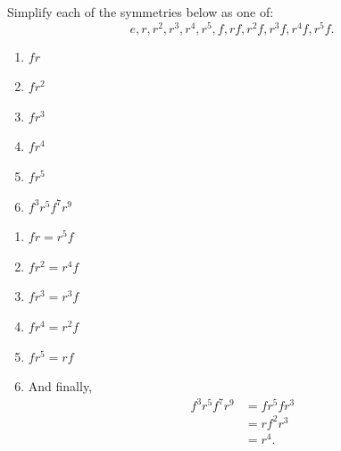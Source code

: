\documentclass[noauthor,nooutcomes,hints,handout]{ximera}
\begin{document}
\begin{question}
 Simplify each of the symmetries below as one of:
 \[
 e,r,r^2,r^3,r^4,r^5,f,rf,r^2f,r^3f, r^4f,r^5f.
 \]

 \begin{enumerate}
 \item $fr$
 \item $fr^2$
 \item $fr^3$
 \item $fr^4$
 \item $fr^5$
 \item $f^3r^5f^7r^9$
 \end{enumerate}
 \begin{freeResponse}
   \begin{enumerate}
   \item $fr = r^5f$
   \item $fr^2 = r^4f$
   \item $fr^3 = r^3f$
   \item $fr^4 = r^2f$
   \item $fr^5 = rf$
   \item And finally,
     \begin{align*}
    f^3r^5f^7r^9 &= fr^5fr^3\\
    &= rf^2r^3\\
    &= r^4.
     \end{align*}
   \end{enumerate}
 \end{freeResponse}
\end{question}
\end{document}
